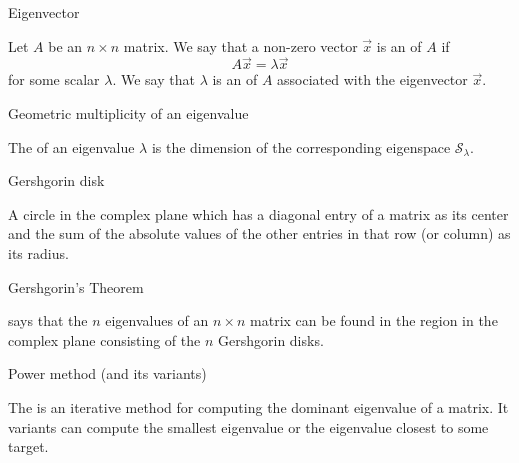 \documentclass{ximera}
\begin{document}
Eigenvector
\begin{expandable}{}{}
    Let $A$ be an $n \times n$ matrix.  We say that a non-zero vector $\vec{x}$ is an  of $A$ if $$A\vec{x} = \lambda \vec{x}$$
for some scalar $\lambda$.
We say that $\lambda$ is an  of $A$ associated with the eigenvector $\vec{x}$.
\end{expandable}


Geometric multiplicity of an eigenvalue
\begin{expandable}{}{}
    The  of an eigenvalue $\lambda$ is the dimension of the corresponding eigenspace $\mathcal{S}_\lambda$.
\end{expandable}


Gershgorin disk
\begin{expandable}{}{}
    A circle in the complex plane which has a diagonal entry of a matrix as its center and the sum of the absolute values of the other entries in that row (or column) as its radius.
\end{expandable}


Gershgorin's Theorem
\begin{expandable}{}{}
     says that the $n$ eigenvalues of an $n \times n$ matrix can be found in the region in the complex plane consisting of the $n$ Gershgorin disks.
\end{expandable}


Power method (and its variants)
\begin{expandable}{}{}
    The  is an iterative method for computing the dominant eigenvalue of a matrix. It variants can compute the smallest eigenvalue or the eigenvalue closest to some target.
\end{expandable}
\end{document}
